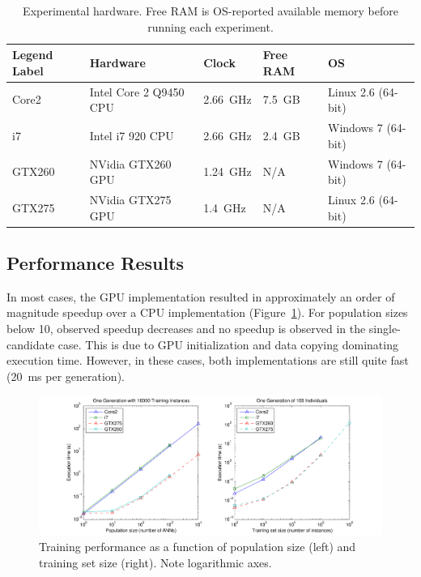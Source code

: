 \documentclass[11pt]{article}       %
\begin{document}
\begin{table}[h]
	\centering
	\begin{tabular}{lllll}
	\textbf{Legend Label} & \textbf{Hardware} & \textbf{Clock} & \textbf{Free RAM} & \textbf{OS} \\
	\hline
	Core2  & Intel Core 2 Q9450 CPU & 2.66~GHz & 7.5~GB & Linux 2.6 (64-bit) \\
	i7     & Intel i7 920 CPU       & 2.66~GHz & 2.4~GB & Windows 7 (64-bit) \\
	GTX260 & NVidia GTX260 GPU      & 1.24~GHz & N/A    & Windows 7 (64-bit) \\
	GTX275 & NVidia GTX275 GPU      & 1.4~GHz  & N/A    & Linux 2.6 (64-bit) \\
	\hline
	\end{tabular}
	\caption{Experimental hardware. Free RAM is OS-reported available memory before running each experiment.}
	\label{tab:experimental-hardware}
\end{table}

\subsection{Performance Results} \label{performance}
In most cases, the GPU implementation resulted in approximately an order of magnitude speedup over a CPU implementation (Figure~\ref{fig:training-performance}). For population sizes below 10, observed speedup decreases and no speedup is observed in the single-candidate case. This is due to GPU initialization and data copying dominating execution time. However, in these cases, both implementations are still quite fast (20~ms per generation).

\begin{figure}[h]
	\centering
	\includegraphics[width=\textwidth]{fig-performance}
	\caption{Training performance as a function of population size (left) and training set size (right). Note logarithmic axes.}
	\label{fig:training-performance}
\end{figure}
\end{document}
